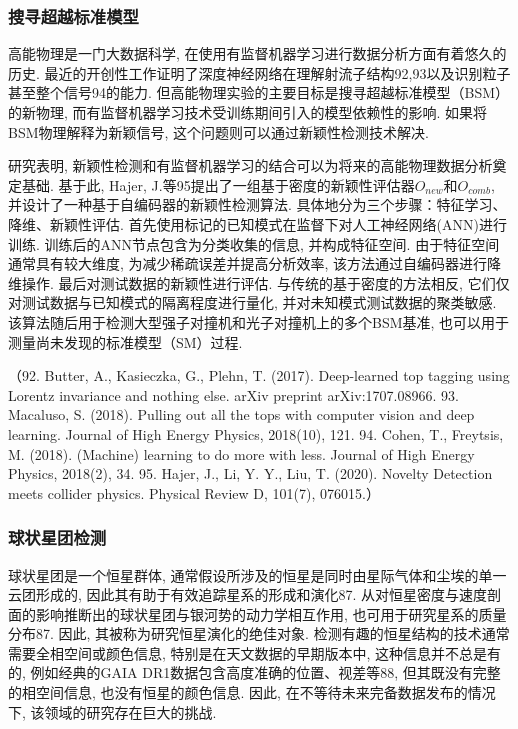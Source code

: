 \documentclass{Style/aas}
\begin{document}
\begin{multicols}{2}
  \subsubsection{搜寻超越标准模型}
  高能物理是一门大数据科学, 在使用有监督机器学习进行数据分析方面有着悠久的历史. 最近的开创性工作证明了深度神经网络在理解射流子结构92,93以及识别粒子甚至整个信号94的能力. 但高能物理实验的主要目标是搜寻超越标准模型（BSM）的新物理, 而有监督机器学习技术受训练期间引入的模型依赖性的影响. 如果将BSM物理解释为新颖信号, 这个问题则可以通过新颖性检测技术解决.

  研究表明, 新颖性检测和有监督机器学习的结合可以为将来的高能物理数据分析奠定基础. 基于此, Hajer, J.等95提出了一组基于密度的新颖性评估器$O_{new}$和$O_{comb}$, 并设计了一种基于自编码器的新颖性检测算法. 具体地分为三个步骤：特征学习、降维、新颖性评估. 首先使用标记的已知模式在监督下对人工神经网络(ANN)进行训练. 训练后的ANN节点包含为分类收集的信息, 并构成特征空间. 由于特征空间通常具有较大维度, 为减少稀疏误差并提高分析效率, 该方法通过自编码器进行降维操作. 最后对测试数据的新颖性进行评估. 与传统的基于密度的方法相反, 它们仅对测试数据与已知模式的隔离程度进行量化, 并对未知模式测试数据的聚类敏感. 该算法随后用于检测大型强子对撞机和光子对撞机上的多个BSM基准, 也可以用于测量尚未发现的标准模型（SM）过程.

  （92.	Butter, A., Kasieczka, G., Plehn, T. (2017). Deep-learned top tagging using Lorentz invariance and nothing else. arXiv preprint arXiv:1707.08966.
  93.	Macaluso, S. (2018). Pulling out all the tops with computer vision and deep learning. Journal of High Energy Physics, 2018(10), 121.
  94.	Cohen, T., Freytsis, M. (2018). (Machine) learning to do more with less. Journal of High Energy Physics, 2018(2), 34.
  95.	Hajer, J., Li, Y. Y., Liu, T. (2020). Novelty Detection meets collider physics. Physical Review D, 101(7), 076015.）

  \subsubsection{球状星团检测}
  球状星团是一个恒星群体, 通常假设所涉及的恒星是同时由星际气体和尘埃的单一云团形成的, 因此其有助于有效追踪星系的形成和演化87. 从对恒星密度与速度剖面的影响推断出的球状星团与银河势的动力学相互作用, 也可用于研究星系的质量分布87. 因此, 其被称为研究恒星演化的绝佳对象. 检测有趣的恒星结构的技术通常需要全相空间或颜色信息, 特别是在天文数据的早期版本中, 这种信息并不总是有的, 例如经典的GAIA DR1数据包含高度准确的位置、视差等88, 但其既没有完整的相空间信息, 也没有恒星的颜色信息. 因此, 在不等待未来完备数据发布的情况下, 该领域的研究存在巨大的挑战.


\end{multicols}
\end{document}
